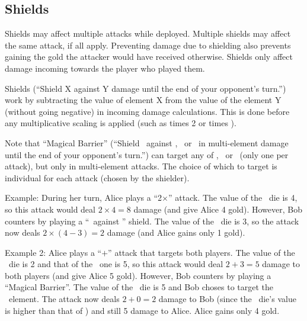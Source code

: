 \documentclass[dvipsnames,parskip,a4paper]{scrartcl}
\newcommand{\iconsize}{3.4mm}
\newcommand{\icondepth}{0.45mm}
\newcommand{\icon}[1]{\raisebox{-\icondepth}{\texttt{[image:  \#1 ]}}}
\newcommand{\fire}{\icon{icons/fire.png}}
\newcommand{\earth}{\icon{icons/earth.png}}
\newcommand{\water}{\icon{icons/water.png}}
\newcommand{\magic}{\icon{icons/magic.png}}
\begin{document}
\subsection*{Shields}

Shields may affect multiple attacks while deployed. Multiple shields may affect the same attack, if all apply. Preventing damage due to shielding also prevents gaining the gold the attacker would have received otherwise. Shields only affect damage incoming towards the player who played them.

\vspace{4pt}

Shields (``Shield X against Y damage until the end of your opponent's turn.'') work by subtracting the value of element X from the value of the element Y (without going negative) in incoming damage calculations. This is done before any multiplicative scaling is applied (such as times 2 or times \magic).

\vspace{4pt}

Note that ``Magical Barrier'' (``Shield \magic \ against \fire, \earth \ or \water \ in multi-element damage until the end of your opponent's turn.'') can target any of \fire, \earth \ or \water \ (only one per attack), but only in multi-element attacks. The choice of which to target is individual for each attack (chosen by the shielder).

\vspace{4pt}

Example: During her turn, Alice plays a ``2\hspace{1pt}$\times$\hspace{1pt}\fire'' attack. The value of the \fire \ die is 4, so this attack would deal $2 \times 4 = 8$ damage (and give Alice 4 gold). However, Bob counters by playing a ``\water \ against \fire'' shield. The value of the \water \ die is 3, so the attack now deals $2 \times (4 - 3) = 2$ damage (and Alice gains only 1 gold).

\vspace{4pt}

Example 2: Alice plays a ``\water\hspace{1pt}$+$\hspace{1pt}\earth'' attack that targets both players. The value of the \water \ die is 2 and that of the \earth \ one is 5, so this attack would deal $2 + 3 = 5$ damage to both players (and give Alice 5 gold). However, Bob counters by playing a ``Magical Barrier''. The value of the \magic \ die is 5 and Bob choses to target the \earth \ element. The attack now deals $2 + 0 = 2$ damage to Bob (since the \magic \ die's value is higher than that of \earth) and still 5 damage to Alice. Alice gains only 4 gold.
\end{document}
